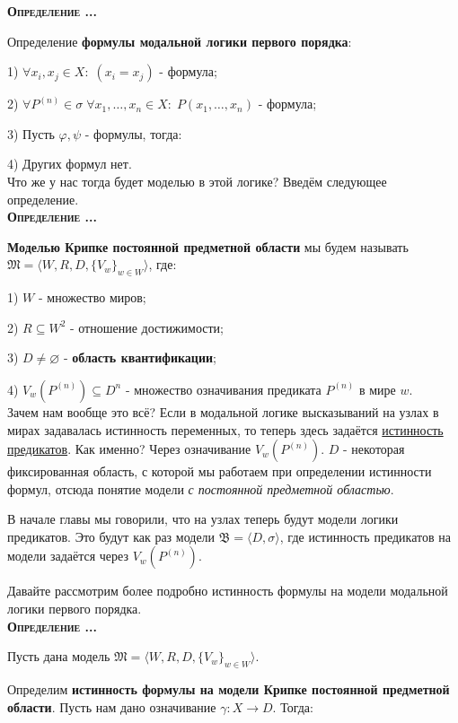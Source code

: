 \documentclass[18pt, a4paper]{extarticle}
\newcounter{par}
\newcounter{spar}
\newcounter{zap}
\newcommand{\opr}{\textbf{\textsc{Определение \thepar.\if\thespar1\thespar.\fi\thezap.\;}}\stepcounter{zap}}
\newcommand{\centr}[1]{\makebox[\linewidth]{#1}}
\newcommand{\mB}{\mathfrak{B}}
\newcommand{\mM}{\mathfrak{M}}
\newcommand{\ampersand}{\;\&\;}
\newcommand{\vp}{\varphi}
\newcommand{\sg}{\sigma}
\newcommand{\lot}[3]{#1_#2,\dots,#1_#3}
\newcommand{\may}{\scalebox{0.8}{$\diamondsuit$}}
\newcommand{\need}{\scalebox{0.75}{$\Box$}}
\begin{document}
\newpage

\opr 

Определение \textbf{формулы модальной логики первого порядка}:

1) $\forall x_i,x_j\in X\!\!:\;(x_i=x_j)$ - формула;

2) $\forall P^{(n)}\in\sg\;\forall\lot x 1 n\in X\!\!:\;P(\lot x 1 n)$ - формула;

3) Пусть $\vp,\psi$ - формулы, тогда:
\\\centr{$(\vp\ampersand\psi),(\vp\vee\psi),(\vp\to\psi),\lnot\vp,\forall x\vp,\exists x\vp,\need\vp,\may\vp$ - формулы;}

4) Других формул нет.\\

Что же у нас тогда будет моделью в этой логике? Введём следующее определение.\\

\opr

\textbf{Моделью Крипке постоянной предметной области} мы будем называть $\mM=\langle W,R,D,\{V_w\}_{w\in W}\rangle$, где:

1) $W$ - множество миров;

2) $R\subseteq W^2$ - отношение достижимости;

3) $D\neq\varnothing$ - \textbf{область квантификации};

4) $V_w(P^{(n)})\subseteq D^n$ - множество означивания предиката $P^{(n)}$ в мире $w$.\\

Зачем нам вообще это всё? Если в модальной логике высказываний на узлах в мирах задавалась истинность переменных, то теперь здесь задаётся \underline{истинность предикатов}. Как именно? Через означивание $V_w(P^{(n)})$. $D$ - некоторая фиксированная область, с которой мы работаем при определении истинности формул, отсюда понятие модели \textit{с постоянной предметной областью}.

В начале главы мы говорили, что на узлах теперь будут модели логики предикатов. Это будут как раз модели $\mB=\langle D,\sg\rangle$, где истинность предикатов на модели задаётся через $V_w(P^{(n)})$. 

Давайте рассмотрим более подробно истинность формулы на модели модальной логики первого порядка.\\

\opr

Пусть дана модель $\mM=\langle W,R,D,\{V_w\}_{w\in W}\rangle$.

Определим \textbf{истинность формулы на модели Крипке постоянной предметной области}. Пусть нам дано означивание $\gamma\!:X\to D$. Тогда:
\end{document}
